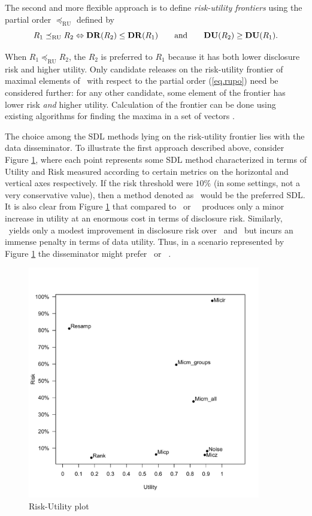 \documentclass[12pt]{article}
\begin{document}
The second and more flexible approach is to define \textit{risk-utility
frontiers} using the partial order $\preceq_{\mathrm{RU}}$ defined
by
\begin{equation}\label{eq.rupo}
R_1 \preceq_{\mathrm{RU}} R_2 \Leftrightarrow \mathbf{DR}(R_2) \leq
\mathbf{DR}(R_1) \qquad\mbox{and}\qquad \mathbf{DU}(R_2) \geq \mathbf{DU}(R_1).
\end{equation}

When $R_1 \preceq_{\mathrm{RU}} R_2$, the $R_2$ is preferred to
$R_1$ because it has both lower disclosure risk and higher
utility. Only candidate releases on the risk-utility frontier of
maximal elements of \RS\ with respect to the partial order
(\ref{eq.rupo}) need be considered further: for any other
candidate, some element of the frontier has lower risk
\textit{and} higher utility. Calculation of the frontier can be
done using existing algorithms for finding the maxima in a set of
vectors \citep{kung-luccio-preparata75}. 


The choice among the SDL methods lying on the risk-utility
frontier lies with the data disseminator. To illustrate the first approach
described above, consider Figure \ref{fig.ruplot}, where each point
represents some SDL method characterized in terms of Utility and Risk 
measured according to certain metrics on the horizontal and vertical axes respectively.
If the risk threshold were $10\%$ (in some settings, not a very conservative value), 
then a method denoted as \NOI\ would be the preferred SDL. It is also clear from Figure \ref{fig.ruplot} that compared to \MICZ\ or \NOI\, \MICI\ produces only a minor increase
in utility at an enormous cost in terms of disclosure risk. Similarly,
\RANK\ yields only a modest improvement in disclosure
risk over \MICP\ and \NOI\, but incurs an immense
penalty in terms of data utility. Thus, in a scenario represented by Figure \ref{fig.ruplot}
 the disseminator  might prefer \NOI\ or \MICP\ .

\begin{figure}
\begin{center}
\includegraphics[width=4in]{R_U_plot.pdf}
\end{center}
\caption{Risk-Utility plot}
\label{fig.ruplot}
\end{figure}
\end{document}
